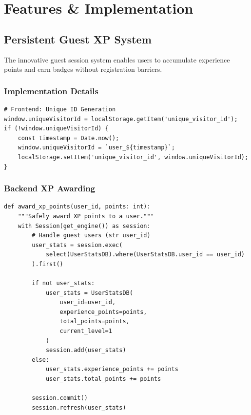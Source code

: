 \documentclass[11pt,a4paper]{article}
\begin{document}
\section{Features \& Implementation}
\label{sec:features}

\subsection{Persistent Guest XP System}

The innovative guest session system enables users to accumulate experience points and earn badges without registration barriers.

\subsubsection{Implementation Details}

\begin{lstlisting}[caption=Guest Session Initialization]
# Frontend: Unique ID Generation
window.uniqueVisitorId = localStorage.getItem('unique_visitor_id');
if (!window.uniqueVisitorId) {
    const timestamp = Date.now();
    window.uniqueVisitorId = `user_${timestamp}`;
    localStorage.setItem('unique_visitor_id', window.uniqueVisitorId);
}
\end{lstlisting}

\subsubsection{Backend XP Awarding}

\begin{lstlisting}[caption=XP Awarding Logic]
def award_xp_points(user_id, points: int):
    """Safely award XP points to a user."""
    with Session(get_engine()) as session:
        # Handle guest users (str user_id)
        user_stats = session.exec(
            select(UserStatsDB).where(UserStatsDB.user_id == user_id)
        ).first()

        if not user_stats:
            user_stats = UserStatsDB(
                user_id=user_id,
                experience_points=points,
                total_points=points,
                current_level=1
            )
            session.add(user_stats)
        else:
            user_stats.experience_points += points
            user_stats.total_points += points

        session.commit()
        session.refresh(user_stats)
\end{lstlisting}
\end{document}
